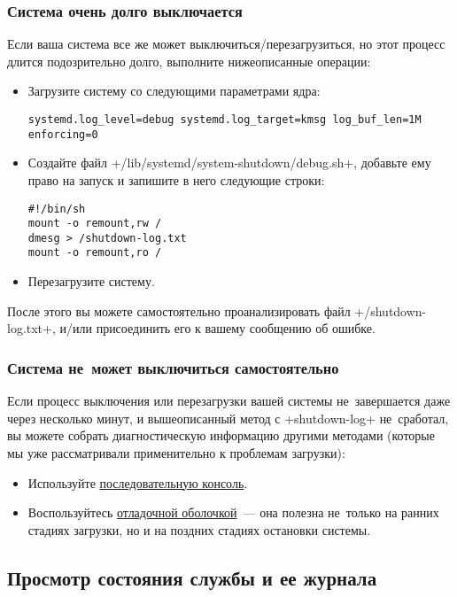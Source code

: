 \documentclass[10pt,oneside,a4paper]{article}
\begin{document}
\subsubsection{Система очень долго выключается}

Если ваша система все же может выключиться/перезагрузиться, но этот процесс
длится подозрительно долго, выполните нижеописанные операции:
\begin{itemize}
	\item Загрузите систему со следующими параметрами ядра:
\begin{Verbatim}
systemd.log_level=debug systemd.log_target=kmsg log_buf_len=1M enforcing=0
\end{Verbatim}
	
	\item Создайте файл +/lib/systemd/system-shutdown/debug.sh+, добавьте
		ему право на запуск и запишите в него следующие строки:
\begin{Verbatim}
#!/bin/sh
mount -o remount,rw /
dmesg > /shutdown-log.txt
mount -o remount,ro /
\end{Verbatim}
	
	\item Перезагрузите систему.
\end{itemize}

После этого вы можете самостоятельно проанализировать файл +/shutdown-log.txt+,
и/или присоединить его к вашему сообщению об ошибке.

\subsubsection{Система не~может выключиться самостоятельно}

Если процесс выключения или перезагрузки вашей системы не~завершается даже через
несколько минут, и вышеописанный метод с +shutdown-log+ не~сработал, вы можете
собрать диагностическую информацию другими методами (которые мы уже
рассматривали применительно к проблемам загрузки):
\begin{itemize}
	\item Используйте \hyperlink{it:serial}{последовательную консоль}.
	\item Воспользуйтесь \hyperlink{it:dbgshell}{отладочной оболочкой}~---
		она полезна не~только на ранних стадиях загрузки, но и на
		поздних стадиях остановки системы. 
\end{itemize}

\subsection{Просмотр состояния службы и ее журнала}
\end{document}

